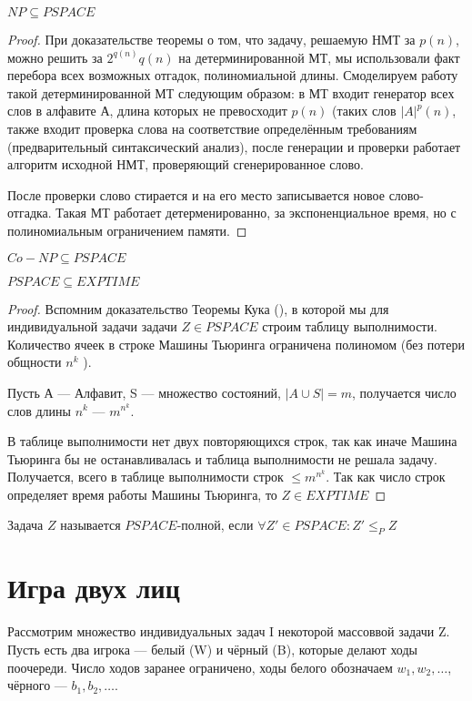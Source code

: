 \begin{proposition}
	$NP \subseteq PSPACE$
\end{proposition}
\begin{proof}
	При доказательстве теоремы о том, что задачу, решаемую НМТ за $p(n)$,
	можно решить за $2^{q(n)}q(n)$ на детерминированной МТ, мы использовали
	факт перебора всех возможных отгадок, полиномиальной длины. Смоделируем
	работу такой детерминированной МТ следующим образом: в МТ входит
	генератор всех слов в алфавите А, длина которых не превосходит  $p(n)$
	(таких слов $|A|^p(n)$,
	также входит проверка слова на соответствие определённым требованиям
	(предварительный синтаксический анализ), после генерации и проверки
	работает алгоритм исходной НМТ, проверяющий сгенерированное слово. 

	После проверки слово стирается и на его место записывается новое
	слово-отгадка. Такая МТ работает детерменированно, за экспоненциальное
	время, но с полиномиальным ограничением памяти.
\end{proof}

\begin{proposition}
	$Co-NP \subseteq PSPACE$
\end{proposition}

\begin{theorem}
	$PSPACE \subseteq EXPTIME$
\end{theorem}
\begin{proof}
	Вспомним доказательство Теоремы Кука (), в которой мы для индивидуальной
	задачи задачи $Z\in PSPACE$ строим таблицу выполнимости. Количество
	ячеек в строке Машины Тьюринга ограничена полиномом (без потери общности
	$n^k$ ).
	
	Пусть А --- Алфавит, S --- множество состояний,  $|A\cup S| = m$,
	получается число слов длины $n^k$ ---  $m^{n^k}$.

	В таблице выполнимости нет двух повторяющихся строк, так как иначе
	Машина Тьюринга бы не останавливалась и таблица выполнимости не решала
	задачу. Получается, всего в таблице выполнимости строк  $\le m^{n^k}$.
	Так как число строк определяет время работы Машины Тьюринга, то  $Z\in
	EXPTIME$
\end{proof}

\begin{definition}
Задача $Z$ называется $PSPACE$-полной, если  $\forall Z' \in PSPACE: Z' \le_P Z$
\end{definition}

\section{Игра двух лиц}
Рассмотрим множество индивидуальных задач I некоторой массоввой задачи Z. Пусть
есть два игрока --- белый (W) и чёрный (B), которые делают ходы поочереди. Число
ходов заранее ограничено, ходы белого обозначаем $w_1, w_2, \ldots$, чёрного ---
$b_1, b_2, \ldots$. 

